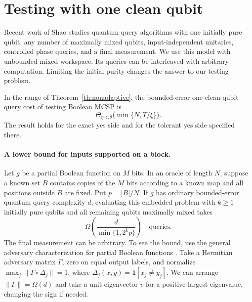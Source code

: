 \section{Testing with one clean qubit}\label{sec:clean}
Recent work of Shao \cite{shao} studies quantum query algorithms with one initially pure qubit, any number of maximally mixed qubits, input-independent unitaries, controlled phase queries, and a final measurement. We use this model with unbounded mixed workspace. Its queries can be interleaved with arbitrary computation. Limiting the initial purity changes the answer to our testing problem.
\begin{theorem}
In the range of Theorem~\ref{th:nonadaptive}, the bounded-error one-clean-qubit query cost of testing Boolean MCSP is
\[
                  \Theta_{\eta,\epsilon,\theta}\bigl(\min\{N,T/\xi\}\bigr).
\]
The result holds for the exact yes side and for the tolerant yes side specified there.
\end{theorem}

\paragraph{A lower bound for inputs supported on a block.}
Let $g$ be a partial Boolean function on $M$ bits. In an oracle of length $N$, suppose a known set $B$ contains copies of the $M$ bits according to a known map and all positions outside $B$ are fixed. Put $p=|B|/N$. If $g$ has ordinary bounded-error quantum query complexity $d$, evaluating this embedded problem with $k\ge1$ initially pure qubits and all remaining qubits maximally mixed takes
\[
                    \Omega\!\left(\frac{d}{\min\{1,2^k p\}}\right)
                    \quad\text{queries}.                                      \tag{3}
\]
The final measurement can be arbitrary. To see the bound, use the general adversary characterization for partial Boolean functions \cite{adv}. Take a Hermitian adversary matrix $\Gamma$, zero on equal output labels, and normalize $\max_j\|\Gamma\circ\Delta_j\|=1$, where $\Delta_j(x,y)=\mathbf1[x_j\ne y_j]$. We can arrange $\|\Gamma\|=\Omega(d)$ and take a unit eigenvector $v$ for a positive largest eigenvalue, changing the sign if needed.

